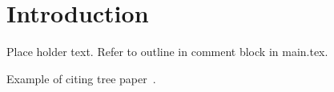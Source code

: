 \section{Introduction} \label{sec:intro}
Place holder text.  Refer to outline in comment block in main.tex.

Example of citing tree paper~\cite{yunits2017tree}.
